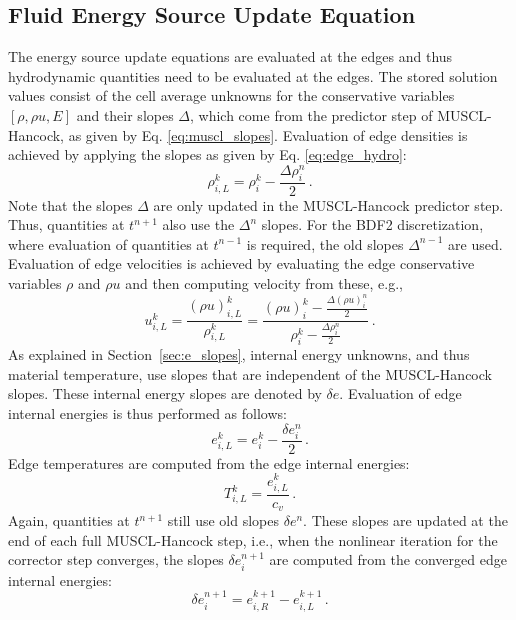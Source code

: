 \documentclass[preprint,12pt]{elsarticle}
\newcommand{\pep}{\, .}
\newcommand{\iL}{_{i,L}}
\newcommand{\iR}{_{i,R}}
\begin{document}
\subsection{Fluid Energy Source Update Equation}
The energy source update equations are evaluated at the edges and thus hydrodynamic
quantities need to be evaluated at the edges. The stored solution values
consist of the cell average unknowns for the conservative variables $[\rho,\rho u,E]$
and their slopes $\Delta$, which come from the predictor step of MUSCL-Hancock,
as given by Eq. \eqref{eq:muscl_slopes}. Evaluation of edge densities is achieved
by applying the slopes as given by Eq. \eqref{eq:edge_hydro}:
\begin{equation}
   \rho\iL^k = \rho_i^k - \frac{\Delta\rho_i^n}{2} \pep
\end{equation}
Note that the slopes $\Delta$ are only updated in the MUSCL-Hancock predictor
step. Thus, quantities at $t^{n+1}$ also use the $\Delta^n$ slopes. For the
BDF2 discretization, where evaluation of quantities at $t^{n-1}$ is required,
the old slopes $\Delta^{n-1}$ are used. Evaluation of edge velocities is
achieved by evaluating the edge conservative variables $\rho$ and $\rho u$
and then computing velocity from these, e.g.,
\begin{equation}
   u\iL^k = \frac{(\rho u)\iL^k}{\rho\iL^k}
          = \frac{(\rho u)_i^k - \frac{\Delta(\rho u)_i^n}{2}}
                 {\rho_i^k - \frac{\Delta\rho_i^n}{2}} \pep
\end{equation}
As explained in Section~\ref{sec:e_slopes}, internal energy unknowns, and thus material
temperature, use slopes that are independent of the MUSCL-Hancock slopes.
These internal energy slopes are denoted by $\delta e$. Evaluation
of edge internal energies is thus performed as follows:
\begin{equation}
   e\iL^k = e_i^k - \frac{\delta e_i^n}{2} \pep
\end{equation}
Edge temperatures are computed from the edge internal energies:
\begin{equation}
   T\iL^k = \frac{e\iL^k}{c_v} \pep
\end{equation}
Again, quantities at $t^{n+1}$ still use old slopes $\delta e^n$. These
slopes are updated at the end of each full MUSCL-Hancock step, i.e.,
when the nonlinear iteration for the corrector step converges, the
slopes $\delta e_i^{n+1}$ are computed from the converged edge internal energies:
\begin{equation}
   \delta e_i^{n+1} = e\iR^{k+1} - e\iL^{k+1} \pep
\end{equation}
\end{document}
